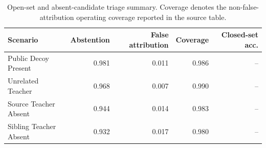 \begin{table}[!htbp]\centering\footnotesize
\caption{Open-set and absent-candidate triage summary. Coverage denotes the non-false-attribution operating coverage reported in the source table.}
\label{tab:supp_open_set_triage}
\begin{tabular}{lrrrr}
\toprule
Scenario & Abstention & False attribution & Coverage & Closed-set acc. \\
\midrule
Public Decoy Present & 0.981 & 0.011 & 0.986 & -- \\
Unrelated Teacher & 0.968 & 0.007 & 0.990 & -- \\
Source Teacher Absent & 0.944 & 0.014 & 0.983 & -- \\
Sibling Teacher Absent & 0.932 & 0.017 & 0.980 & -- \\
\bottomrule
\end{tabular}
\end{table}
